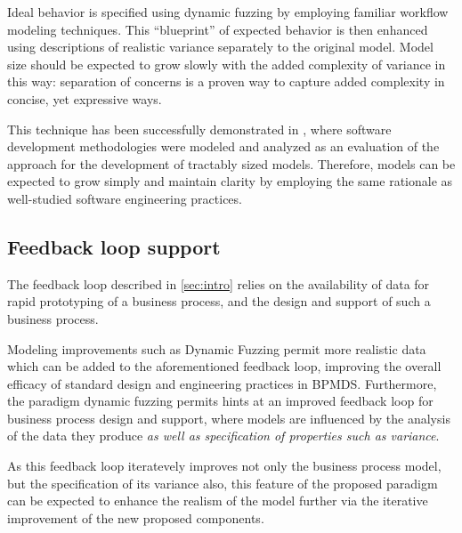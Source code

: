 \documentclass[12pt]{llncs}  %
\begin{document}
Ideal behavior is specified using dynamic fuzzing by employing familiar workflow
modeling techniques. This ``blueprint'' of expected behavior is then enhanced
using descriptions of realistic variance separately to the original model. Model
size should be expected to grow slowly with the added complexity of variance in
this way: separation of concerns is a proven way to capture added complexity in
concise, yet expressive ways\citep{kiczales1997aspect}.
\par

This technique has been successfully demonstrated in \cite{wallis2018modelling},
where software development methodologies were modeled and analyzed as an
evaluation of the approach for the development of tractably sized models.
Therefore, models can be expected to grow simply and maintain clarity by
employing the same rationale as well-studied software engineering practices.
\par

\subsection{Feedback loop support}
The feedback loop described in \cref{sec:intro} relies on the availability of data for rapid prototyping of a
business process, and the design and support of such a business process.
\par

Modeling improvements such as Dynamic Fuzzing permit more realistic data which
can be added to the aforementioned feedback loop, improving the overall efficacy
of standard design and engineering practices in BPMDS. Furthermore, the paradigm
dynamic fuzzing permits hints at an improved feedback loop for business process
design and support, where models are influenced by the analysis of the data they
produce \emph{as well as specification of properties such as variance}. 
\par


As this feedback loop iteratevely improves not only the business process model,
but the specification of its variance also, this feature of the proposed
paradigm can be expected to enhance the realism of the model further via the
iterative improvement of the new proposed components.
\par


\end{document}
